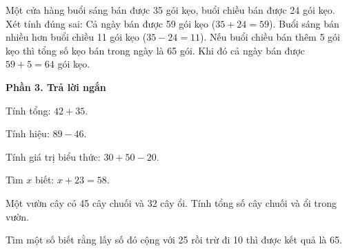 \begin{ex} %
Một cửa hàng buổi sáng bán được 35 gói kẹo, buổi chiều bán được 24 gói kẹo. Xét tính đúng sai:
\choiceTF
{\True Cả ngày bán được 59 gói kẹo ($35 + 24 = 59$).}
{\True Buổi sáng bán nhiều hơn buổi chiều 11 gói kẹo ($35 - 24 = 11$).}
{Nếu buổi chiều bán thêm 5 gói kẹo thì tổng số kẹo bán trong ngày là 65 gói.}
{\True Khi đó cả ngày bán được $59 + 5 = 64$ gói kẹo.}
\end{ex}

\textbf{Phần 3. Trả lời ngắn}

\begin{ex} %
Tính tổng: $42 + 35$.
\end{ex}

\begin{ex} %
Tính hiệu: $89 - 46$.
\end{ex}

\begin{ex} %
Tính giá trị biểu thức: $30 + 50 - 20$.
\end{ex}

\begin{ex} %
Tìm $x$ biết: $x + 23 = 58$.
\end{ex}

\begin{ex} %
Một vườn cây có 45 cây chuối và 32 cây ổi. Tính tổng số cây chuối và ổi trong vườn.
\end{ex}

\begin{ex} %
Tìm một số biết rằng lấy số đó cộng với 25 rồi trừ đi 10 thì được kết quả là 65.
\end{ex}
